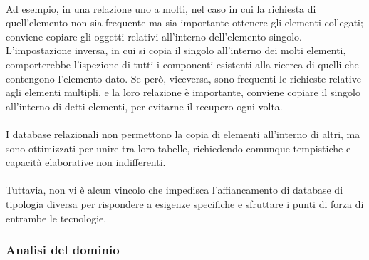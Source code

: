 \\
Ad esempio, in una relazione uno a molti, nel caso in cui la richiesta di quell’elemento non sia frequente ma sia importante ottenere gli elementi collegati; 
conviene copiare gli oggetti relativi all’interno dell’elemento singolo. 
L’impostazione inversa, in cui si copia il singolo all’interno dei molti elementi, 
comporterebbe l’ispezione di tutti i componenti esistenti alla ricerca di quelli che contengono l’elemento dato. 
Se però, viceversa, sono frequenti le richieste relative agli elementi multipli, e la loro relazione è importante, 
conviene copiare il singolo all'interno di detti elementi, per evitarne il recupero ogni volta.\\
\\
I database relazionali non permettono la copia di elementi all’interno di altri, ma sono ottimizzati per unire tra loro tabelle, 
richiedendo comunque tempistiche e capacità elaborative non indifferenti. \\
\\
Tuttavia, non vi è alcun vincolo che impedisca l’affiancamento di database di tipologia diversa per rispondere a esigenze specifiche e sfruttare i punti di forza di entrambe le tecnologie.

\subsubsection{Analisi del dominio}

